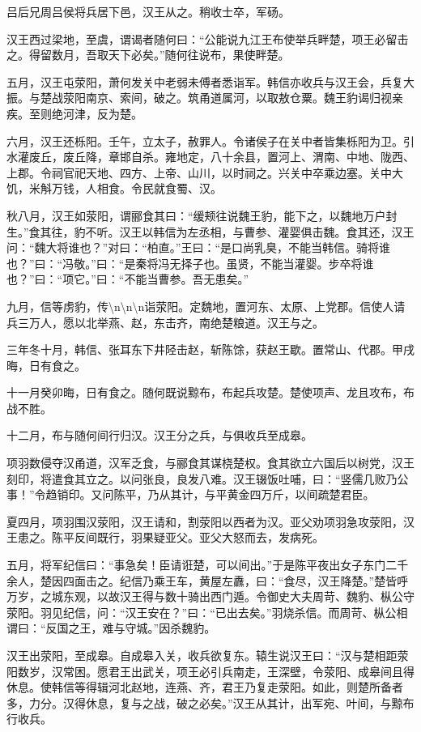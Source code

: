 \documentclass[]{article}
\begin{document}
吕后兄周吕侯将兵居下邑，汉王从之。稍收士卒，军砀。

汉王西过梁地，至虞，谓谒者随何曰：``公能说九江王布使举兵畔楚，项王必留击之。得留数月，吾取天下必矣。''随何往说布，果使畔楚。

五月，汉王屯荥阳，萧何发关中老弱未傅者悉诣军。韩信亦收兵与汉王会，兵复大振。与楚战荥阳南京、索间，破之。筑甬道属河，以取敖仓粟。魏王豹谒归视亲疾。至则绝河津，反为楚。

六月，汉王还栎阳。壬午，立太子，赦罪人。令诸侯子在关中者皆集栎阳为卫。引水灌废丘，废丘降，章邯自杀。雍地定，八十余县，置河上、渭南、中地、陇西、上郡。令祠官祀天地、四方、上帝、山川，以时祠之。兴关中卒乘边塞。关中大饥，米斛万钱，人相食。令民就食蜀、汉。

秋八月，汉王如荥阳，谓郦食其曰：``缓颊往说魏王豹，能下之，以魏地万户封生。''食其往，豹不听。汉王以韩信为左丞相，与曹参、灌婴俱击魏。食其还，汉王问：``魏大将谁也？''对曰：``柏直。''王曰：``是口尚乳臭，不能当韩信。骑将谁也？''曰：``冯敬。''曰：``是秦将冯无择子也。虽贤，不能当灌婴。步卒将谁也？''曰：``项它。''曰：``不能当曹参。吾无患矣。''

九月，信等虏豹，传\textbackslash{}n\textbackslash{}n\textbackslash{}n诣荥阳。定魏地，置河东、太原、上党郡。信使人请兵三万人，愿以北举燕、赵，东击齐，南绝楚粮道。汉王与之。

三年冬十月，韩信、张耳东下井陉击赵，斩陈馀，获赵王歇。置常山、代郡。甲戌晦，日有食之。

十一月癸卯晦，日有食之。随何既说黥布，布起兵攻楚。楚使项声、龙且攻布，布战不胜。

十二月，布与随何间行归汉。汉王分之兵，与俱收兵至成皋。

项羽数侵夺汉甬道，汉军乏食，与郦食其谋桡楚权。食其欲立六国后以树党，汉王刻印，将遣食其立之。以问张良，良发八难。汉王辍饭吐哺，曰：``竖儒几败乃公事！''令趋销印。又问陈平，乃从其计，与平黄金四万斤，以间疏楚君臣。

夏四月，项羽围汉荥阳，汉王请和，割荥阳以西者为汉。亚父劝项羽急攻荥阳，汉王患之。陈平反间既行，羽果疑亚父。亚父大怒而去，发病死。

五月，将军纪信曰：``事急矣！臣请诳楚，可以间出。''于是陈平夜出女子东门二千余人，楚因四面击之。纪信乃乘王车，黄屋左纛，曰：``食尽，汉王降楚。''楚皆呼万岁，之城东观，以故汉王得与数十骑出西门遁。令御史大夫周苛、魏豹、枞公守荥阳。羽见纪信，问：``汉王安在？''曰：``已出去矣。''羽烧杀信。而周苛、枞公相谓曰：``反国之王，难与守城。''因杀魏豹。

汉王出荥阳，至成皋。自成皋入关，收兵欲复东。辕生说汉王曰：``汉与楚相距荥阳数岁，汉常困。愿君王出武关，项王必引兵南走，王深壁，令荥阳、成皋间且得休息。使韩信等得辑河北赵地，连燕、齐，君王乃复走荥阳。如此，则楚所备者多，力分。汉得休息，复与之战，破之必矣。''汉王从其计，出军宛、叶间，与黥布行收兵。
\end{document}
